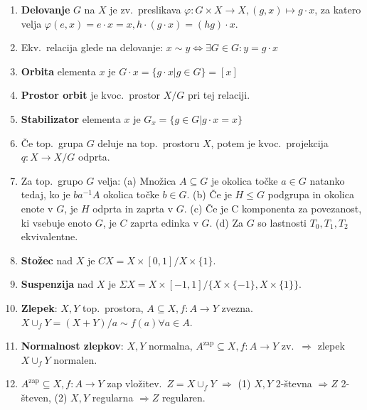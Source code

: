 \documentclass[10pt,a4paper]{article}
\begin{document}
\begin{enumerate}
\item \textbf{Delovanje} $G$ na $X$ je zv.~preslikava $\varphi: G \times X
    \rightarrow X, (g, x) \mapsto g \cdot x$, za katero velja $\varphi(e, x) =
    e \cdot x = x, h \cdot (g \cdot x) = (hg) \cdot x$.
    
\item Ekv.~relacija glede na delovanje: $x \sim y \Leftrightarrow \exists G \in G:
    y = g \cdot x$
    
\item \textbf{Orbita} elementa $x$ je $G \cdot x = \{g \cdot x | g \in G\} = [x]$
    
\item \textbf{Prostor orbit} je kvoc.~prostor $X/G$ pri tej relaciji.
    
\item \textbf{Stabilizator} elementa $x$ je $G_x = \{g \in G | g \cdot x = x\}$
    
\item Če top.~grupa $G$ deluje na top.~prostoru $X$, potem je kvoc.~projekcija
    $q: X \rightarrow X/G$ odprta.
    
\item Za top.~grupo $G$ velja: (a) Množica $A \subseteq G$ je okolica točke
    $a \in G$ natanko tedaj, ko je $ba^{-1}A$ okolica točke $b \in G$.
    (b) Če je $H \leq G$ podgrupa in okolica enote v $G$, je $H$ odprta in zaprta v $G$.
    (c) Če je C komponenta za povezanost, ki vsebuje enoto $G$, je $C$ zaprta edinka v $G$.
    (d) Za $G$ so lastnosti $T_0, T_1, T_2$ ekvivalentne.
    
\item \textbf{Stožec} nad $X$ je $CX = X \times [0, 1]/X \times \{1\}$.
    
\item \textbf{Suspenzija} nad $X$ je $\Sigma  X = X \times [-1, 1]/
    \{X \times \{-1\}, X \times \{1\}\}$.
    
\item \textbf{Zlepek}: $X, Y$ top.~prostora, $A \subseteq X, f: A \rightarrow Y$
    zvezna.~$X \cup_f Y = (X + Y)/a \sim f(a) \forall a \in A$.
    
\item \textbf{Normalnost zlepkov}: $X, Y$ normalna, $A^{\text{zap}} \subseteq X, f:
    A \rightarrow Y$ zv.~$\Rightarrow$ zlepek $X \cup_f Y$ normalen.
    
\item $A^{\text{zap}} \subseteq X, f: A \rightarrow Y$ zap vložitev.~$Z = X \cup_f Y$
    $\Rightarrow$ (1) $X, Y$ 2-števna $\Rightarrow Z$ 2-števen,
    (2) $X, Y$ regularna $\Rightarrow Z$ regularen.
    

\end{enumerate}
\end{document}
